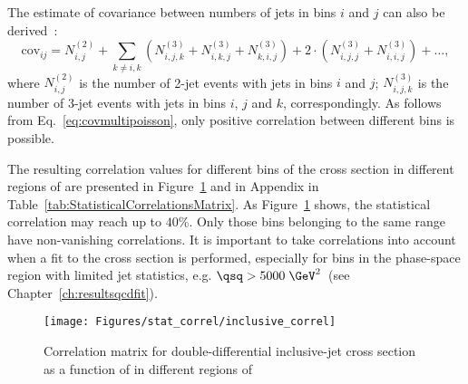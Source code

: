 The estimate of covariance between numbers of jets in bins $i$ and $j$ can also be derived~\cite{upub:juanstatcorrel}:
\begin{equation}
 \mathrm{cov}_{ij} = N_{i,j}^{\left(2\right)} + \sum_{k\neq i,k}{\left(N_{i,j,k}^{\left(3\right)} + N_{i,k,j}^{\left(3\right)} + N_{k,i,j}^{\left(3\right)} \right) + 2\cdot\left( N_{i,j,j}^{\left(3\right)} + N_{i,i,j}^{\left(3\right)} \right) + \ldots },
 \label{eq:covmultipoisson}
\end{equation}
where $N_{i,j}^{\left(2\right)}$ is the number of 2-jet events with jets in bins $i$ and $j$; $N_{i,j,k}^{\left(3\right)}$ is the number of 3-jet events with jets in bins $i$, $j$ and $k$, correspondingly. As follows from Eq.~\eqref{eq:covmultipoisson}, only positive correlation between different bins is possible.

The resulting correlation values for different bins of the \dsdetjetb cross section in different regions of \qsq are presented in Figure~\ref{fig:correlmatrix} and in Appendix in Table~\ref{tab:StatisticalCorrelationsMatrix}. As Figure~\ref{fig:correlmatrix} shows, the statistical correlation may reach up to $40\%$. Only those \etjetb bins belonging to the same \qsq range have non-vanishing correlations. It is important to take correlations into account when a fit to the cross section is performed, especially for bins in the phase-space region with limited jet statistics, e.g. $\qsq > 5000\;\GeV^2$~(see Chapter~\ref{ch:resultsqcdfit}).
\begin{figure}
	\centering
		\texttt{[image: Figures/stat\_correl/inclusive\_correl]}
	\caption{Correlation matrix for double-differential inclusive-jet cross section as a function of \etjetb in different regions of \qsq}
	\label{fig:correlmatrix}
\end{figure}
